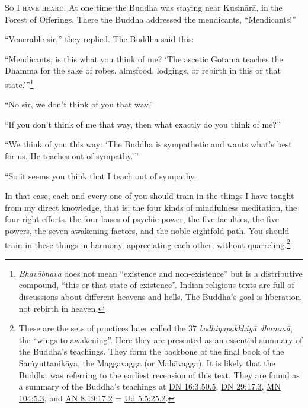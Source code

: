 \documentclass[12pt,openany]{book}%
\newcommand*{\scevam}[1]{\textsc{#1}}
\begin{document}
\scevam{So I have heard. }At one time the Buddha was staying near \textsanskrit{Kusinārā}, in the Forest of Offerings. There the Buddha addressed the mendicants, “Mendicants!” 

“Venerable sir,” they replied. The Buddha said this: 

“Mendicants, is this what you think of me? ‘The ascetic Gotama teaches the Dhamma for the sake of robes, almsfood, lodgings, or rebirth in this or that state.’”\footnote{\textit{\textsanskrit{Bhavābhava}} does not mean “existence and non-existence” but is a distributive compound, “this or that state of existence”. Indian religious texts are full of discussions about different heavens and hells. The Buddha’s goal is liberation, not rebirth in heaven. } 

“No sir, we don’t think of you that way.” 

“If you don’t think of me that way, then what exactly do you think of me?” 

“We think of you this way: ‘The Buddha is sympathetic and wants what’s best for us. He teaches out of sympathy.’” 

“So it seems you think that I teach out of sympathy. 

In that case, each and every one of you should train in the things I have taught from my direct knowledge, that is: the four kinds of mindfulness meditation, the four right efforts, the four bases of psychic power, the five faculties, the five powers, the seven awakening factors, and the noble eightfold path. You should train in these things in harmony, appreciating each other, without quarreling.\footnote{These are the sets of practices later called the 37 \textit{\textsanskrit{bodhiyapakkhiyā} \textsanskrit{dhammā}}, the “wings to awakening”. Here they are presented as an essential summary of the Buddha’s teachings. They form the backbone of the final book of the \textsanskrit{Saṁyuttanikāya}, the Maggavagga (or \textsanskrit{Mahāvagga}). It is likely that the Buddha was referring to the earliest recension of this text. They are found as a summary of the Buddha’s teachings at \href{https://suttacentral.net/dn16/en/sujato\#3.50.5}{DN 16:3.50.5}, \href{https://suttacentral.net/dn29/en/sujato\#17.3}{DN 29:17.3}, \href{https://suttacentral.net/mn104/en/sujato\#5.3}{MN 104:5.3}, and \href{https://suttacentral.net/an8.19/en/sujato\#17.2}{AN 8.19:17.2} = \href{https://suttacentral.net/ud5.5/en/sujato\#25.2}{Ud 5.5:25.2}. } 
\end{document}
